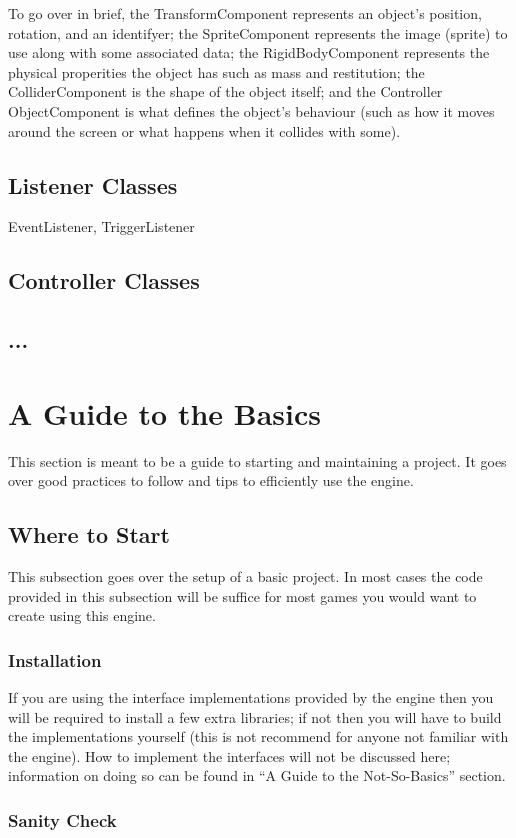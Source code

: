 \documentclass[12pt]{article}
\begin{document}
To go over in brief, the TransformComponent represents an object's position, rotation, and an identifyer; the SpriteComponent represents the image (sprite) to use along with some associated data; the RigidBodyComponent represents the physical properities the object has such as mass and restitution; the ColliderComponent is the shape of the object itself; and the Controller ObjectComponent is what defines the object's behaviour (such as how it moves around the screen or what happens when it collides with some).

\subsection{Listener Classes}
EventListener, TriggerListener
\subsection{Controller Classes}
\subsection{...}
\section{A Guide to the Basics}
This section is meant to be a guide to starting and maintaining a project. It goes over good practices to follow and tips to efficiently use the engine.
\subsection{Where to Start}
This subsection goes over the setup of a basic project. In most cases the code provided in this subsection will be suffice for most games you would want to create using this engine.
\subsubsection{Installation}
If you are using the interface implementations provided by the engine then you will be required to install a few extra libraries; if not then you will have to build the implementations yourself (this is not recommend for anyone not familiar with the engine). How to implement the interfaces will not be discussed here; information on doing so can be found in ``A Guide to the Not-So-Basics'' section.
\subsubsection{Sanity Check}
\end{document}

